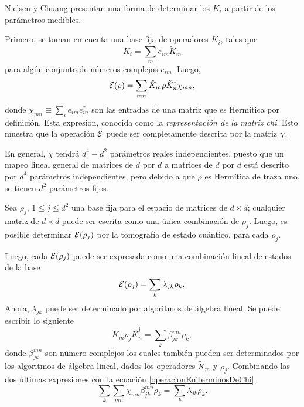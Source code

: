 Nielsen y Chuang {\cite{nielsen_chuang_2010}} presentan una forma de determinar los $K_i$  a partir de los parámetros medibles.

Primero, se toman en cuenta una base fija de operadores $\tilde{K_i}$, tales que  \begin{equation}\label{Basefija}
    K_i=\sum_m e_{im}\tilde{K}_m
\end{equation}
para algún conjunto de números complejos $e_{im}$. Luego, 
\begin{equation}\label{operacionEnTerminosDeChi}
    \mathcal{E}(\rho)=\sum_{mn}\tilde{K}_m\rho \tilde{K}_n^\dagger \chi_{mn},
\end{equation}
donde $\chi_{mn}\equiv \sum_i e_{im}e_{in}^*$ son las entradas de una matriz que es Hermítica por definición. Esta expresión, conocida como la \textit{representación de la matriz chi}. Esto muestra que la operación $\mathcal{E}$ puede ser completamente descrita por la matriz $\chi$.

En general, $\chi$ tendrá $d^4-d^2$ parámetros reales independientes, puesto que un mapeo lineal general de matrices de $d$ por $d$ a matrices de $d$ por $d$ está descrito por $d^4$ parámetros independientes, pero debido a que $\rho$ es Hermítica de traza uno, se tienen $d^2$ parámetros fijos.

Sea $\rho_j$, $1 \le j\le d^2$ una base fija para el espacio de matrices de $d\times d$; cualquier matriz de $d\times d$ puede ser escrita como una única combinación de $\rho_j$. Luego, es posible determinar $\mathcal{E}(\rho_j)$ por la tomografía de estado cuántico, para cada $\rho_j$.

Luego, cada $\mathcal{E}(\rho_j)$ puede ser expresada como una combinación lineal de estados de la base 
\begin{equation}\label{E_en_terminos_de_la_base}
    \mathcal{E}(\rho_j)=\sum_k \lambda _{jk}\rho_k.
\end{equation}
Ahora, $\lambda_{jk}$ puede ser determinado por algoritmos de álgebra lineal. Se puede escribir lo siguiente
\begin{equation}
    \tilde{K}_m\rho_j \tilde{K}_n^\dagger=\sum_k\beta_{jk}^{mn}\rho_k,
\end{equation}
donde $\beta_{jk}^{mn}$ son número complejos los cuales también pueden ser determinados por los algoritmos de álgebra lineal, dados los operadores $\tilde{K}_m$ y $\rho_j$.  Combinando las dos últimas expresiones con la ecuación {\ref{operacionEnTerminosDeChi}}
\begin{equation}
\sum_k \sum_{mn}\chi_{mn}\beta_{jk}^{mn}\rho_k=\sum_k\lambda_{jk}\rho_k.
\end{equation}

